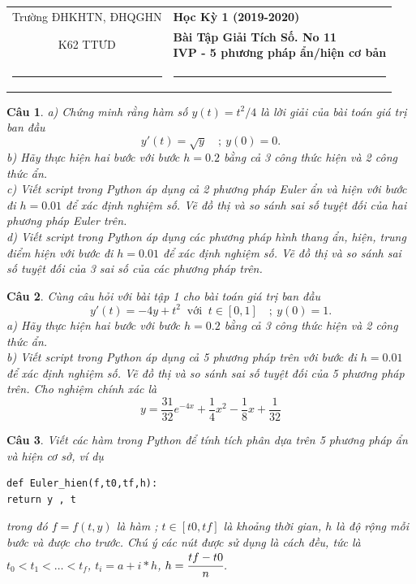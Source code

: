 \documentclass[11pt]{article}
\newtheorem{bt}{Câu}
\begin{document}
\begin{tabular*}
{\linewidth}{c>{\centering\hspace{0pt}} p{}}
Trường ĐHKHTN, ĐHQGHN & {\bf Học Kỳ 1 (2019-2020)}
\tabularnewline
K62 TTƯD & {\bf Bài Tập Giải Tích Số. No 11 \\ IVP - 5 phương pháp ẩn/hiện cơ bản}
\tabularnewline
\rule{1in}{1pt}  \small  & \rule{2in}{1pt} %
\tabularnewline

\end{tabular*}
%

\begin{bt}
a) Chứng minh rằng hàm số $y(t) = t^2/4$ là lời giải của bài toán giá trị ban đầu
\begin{equation*}
y'(t) = \sqrt{y} \quad ; \  y(0) = 0. 
\end{equation*}
b) Hãy thực hiện hai bước với bước $h = 0.2$ bằng cả 3 công thức hiện và 2 công thức ẩn. \\
c) Viết script trong Python áp dụng cả 2 phương pháp Euler ẩn và hiện với bước đi $h = 0.01$ để xác định nghiệm số. Vẽ đồ thị và so sánh sai số tuyệt đối của hai phương pháp Euler trên. \\
d) Viết script trong Python áp dụng các phương pháp hình thang ẩn, hiện, trung điểm hiện với bước đi $h = 0.01$ để xác định nghiệm số. Vẽ đồ thị và so sánh sai số tuyệt đối của 3 sai số của các phương pháp trên.
\end{bt}

\begin{bt}
Cùng câu hỏi với bài tập 1 cho bài toán giá trị ban đầu
\begin{equation*}
y'(t) = - 4y + t^2  \ \mbox{ với } \ t\in [0,1] \quad ; \  y(0) = 1. 
\end{equation*}
a) Hãy thực hiện hai bước với bước $h = 0.2$ bằng cả 3 công thức hiện và 2 công thức ẩn. \\
b) Viết script trong Python áp dụng cả 5 phương pháp trên với bước đi $h = 0.01$ để xác định nghiệm số. Vẽ đồ thị và so sánh sai số tuyệt đối của 5 phương pháp trên.
Cho nghiệm chính xác là 
%
\[
y = \dfrac{31}{32} e^{-4x} + \dfrac{1}{4} x^2 - \dfrac{1}{8} x + \dfrac{1}{32}
\]
%
\end{bt}

\begin{bt} Viết các hàm trong Python để tính tích phân dựa trên 5 phương pháp ẩn và hiện cơ sở, ví dụ 
%
\begin{lstlisting}[frame=single] 
def Euler_hien(f,t0,tf,h):
return y , t
\end{lstlisting}
%	 
trong đó $f = f(t,y)$ là hàm \quad ; $t \in [t0,tf]$ là khoảng thời gian, $h$ là độ rộng mỗi bước và được cho trước. Chú ý các nút được sử dụng là cách đều, tức là $t_0<t_1<\dots<t_f$, $t_i = a+i*h$, $h=\cfrac{tf-t0}{n}$. 


\end{bt}
\end{document}
